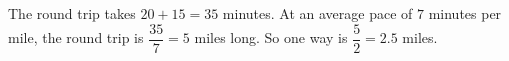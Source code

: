 The round trip takes $20+15=35$ minutes. At an average pace of $7$ minutes per mile, the round trip is $\dfrac{35}{7}=5$ miles long. So one way is $\dfrac{5}{2}=\boxed{2.5}$ miles.
